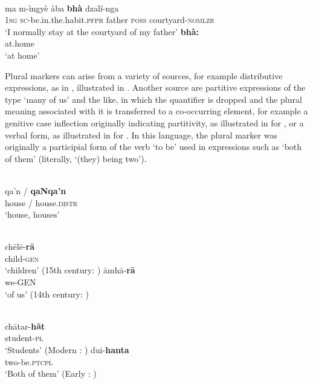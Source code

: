 \documentclass[output=paper]{langsci/langscibook}
\begin{document}
\ea\label{ngiti}
\\
\ea
\gll ma m-ìngyè àba \textbf{bhà} {\textbari}dzalí-nga  \\
\textsc{1sg} \textsc{sc}-be.in.the.habit.\textsc{pfpr} father \textsc{poss} courtyard-\textsc{nomlzr} \\
\glt `I normally stay at the courtyard of my father' \citep[322]{Ngiti} 
\ex
\gll \textbf{bhà:} \\
at.home \\
\glt `at home' \citep[154]{Ngiti}
\z
\z
{}

Plural markers can arise from a variety of  sources,
for example distributive expressions, as in , illustrated
in . Another source are partitive expressions of the type
`many of us' and the like, in which 
the quantifier is dropped and
the plural meaning associated with it is transferred to a
co-occurring element, for example a genitive case inflection originally
indicating partitivity, as illustrated  in  for ,
 or a
verbal form, as illustrated in  for . In this
language, the plural marker was originally a participial form
of the verb `to be'  used in expressions such as `both of them'
(literally, `(they) being two').

\ea\label{paiute}
\\
\gll qa'n{\textsci} / \textbf{qa{\textipa N}qa'n{\textsci}} \\
house / house.\textsc{distr} \\
\glt `house, houses' \citep[258]{Sapir1930}
\z
{}



\ea\label{bengali}
\\
\ea
\gll ch\=el\=e-\textbf{r\=a}  \\
child-\textsc{gen} \\

\glt `children' (15th century: \citealt[736]{Chatterji})
\ex
\gll \=amh\=a-\textbf{r\=a}  \\
we-GEN  \\
\glt `of us' (14th century: \citealt[735]{Chatterji})
\z
\z


\ea\label{assamese}
\\
\ea
\gll ch\=atar-\textbf{hãt} \\
student-\textsc{pl} \\
\glt `Students' (Modern : \citealt[295]{Assamese})
\ex
\gll dui-\textbf{hanta} \\
two-be.\textsc{ptcpl} \\
\glt `Both of them' (Early : \citealt[282]{Assamese})
\z
\z
{}
\end{document}
